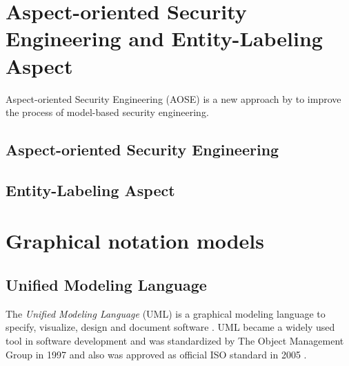 \documentclass[twoside, openright, 12pt]{book}
\begin{document}




\section{Aspect-oriented Security Engineering and Entity-Labeling Aspect}
\label{AOSEEL}
Aspect-oriented Security Engineering (AOSE) is a new approach by \citet*{Amthor18} to improve the process of model-based security engineering.



\subsection{Aspect-oriented Security Engineering}
\label{AOSE}


\subsection{Entity-Labeling Aspect}
\label{EL}




\section{Graphical notation models}
\label{graphical_notations}

\subsection{Unified Modeling Language}
\label{UML}
The \textit{Unified Modeling Language} (UML) is a graphical modeling language to specify, visualize, design and document software \citep{UML_OMG}.
UML became a widely used tool in software development and was standardized by The Object Management Group in 1997 and also was approved as official ISO standard in 2005 \citep{UML_ISO}.
\end{document}
